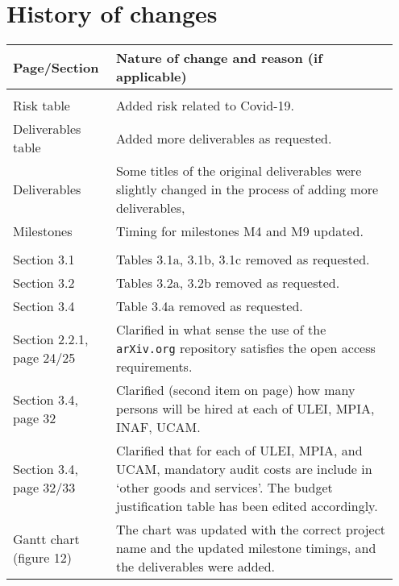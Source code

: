\section*{History of changes}

\begin{tabular}{|>{\raggedright}p{0.25\linewidth}|>{\raggedright}p{0.7\linewidth}|}
\hline
\textbf{Page/Section} & \textbf{Nature of change and reason (if applicable)} \tabularnewline
\hline
\multicolumn{2}{|l|}{\textbf{Part A}} \tabularnewline
\hline
Risk table & Added risk related to Covid-19. \tabularnewline
\hline
Deliverables table & Added more deliverables as requested. \tabularnewline
\hline
Deliverables & Some titles of the original deliverables were slightly changed in the process of adding more deliverables, \tabularnewline
\hline
Milestones & Timing for milestones M4 and M9 updated. \tabularnewline
\hline
\multicolumn{2}{|l|}{\textbf{Part B}} \tabularnewline
\hline
Section 3.1 & Tables 3.1a, 3.1b, 3.1c removed as requested. \tabularnewline
\hline
Section 3.2 & Tables 3.2a, 3.2b removed as requested. \tabularnewline
\hline
Section 3.4 & Table 3.4a removed as requested. \tabularnewline
\hline
Section 2.2.1, page 24/25 & Clarified in what sense the use of the \texttt{arXiv.org} repository satisfies the open access requirements. \tabularnewline
\hline
Section 3.4, page 32 & Clarified (second item on page) how many persons will be hired at each of ULEI, MPIA, INAF, UCAM. \tabularnewline
\hline
Section 3.4, page 32/33 & Clarified that for each of ULEI, MPIA, and UCAM, mandatory audit costs are include in `other goods and services'. The budget justification table has been edited accordingly. \tabularnewline
\hline 
Gantt chart (figure 12) & The chart was updated with the correct project name and the updated milestone timings, and the deliverables were added. \tabularnewline
\hline
\end{tabular}